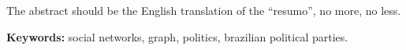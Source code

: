 The abstract should be the English translation of the ``resumo'', no more, no less.

\textbf{Keywords:} social networks, graph, politics, brazilian political parties.
